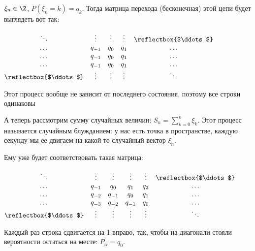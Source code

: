 \begin{exmp}
    $\xi_n \in \Z$, $P(\xi_n = k) = q_k$.
    Тогда матрица перехода (бесконечная) этой цепи будет выглядеть вот так:

$\begin{matrix}
\ddots & \vdots & \vdots & \vdots & \reflectbox{$\ddots$}\\
\dots  & q_{-1} & q_0    & q_1    & \dots \\
\dots  & q_{-1} & q_0    & q_1    & \dots \\
\dots  & q_{-1} & q_0    & q_1    & \dots \\
\reflectbox{$\ddots$} & \vdots & \vdots & \vdots & \ddots
\end{matrix}$

Этот процесс вообще не зависит от последнего состояния, поэтому все строки одинаковы
\end{exmp}

\begin{exmp}
А теперь рассмотрим сумму случайных величин: $S_n = \sum\limits_{k=0}^n \xi_k$. 
Этот процесс называется случайным блужданием: у нас есть точка в пространстве, каждую секунду мы ее двигаем на какой-то случайный вектор $\xi_n$.

Ему уже будет соответствовать такая матрица:

$\begin{matrix}
\ddots & \vdots & \vdots & \vdots & \vdots & \reflectbox{$\ddots$}\\
\dots  & q_{-1} & q_0    & q_1    & q_2    & \dots \\
\dots  & q_{-2} & q_{-1} & q_0    & q_1    & \dots \\
\dots  & q_{-3} & q_{-2} & q_{-1} & q_0    & \dots \\
\reflectbox{$\ddots$} & \vdots & \vdots & \vdots & \vdots & \ddots
\end{matrix}$

Каждый раз строка сдвигается на 1 вправо, так, чтобы на диагонали стояли вероятности остаться на месте: $P_{ii} = q_0$.
\end{exmp}


